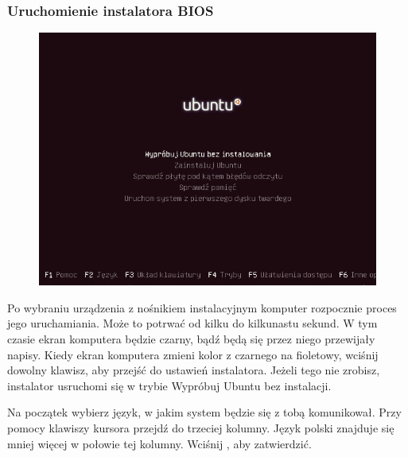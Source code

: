\subsubsection{Uruchomienie instalatora BIOS}
\label{instalacja_uruchomienie}
\begin{figure}
	\vspace{-10pt}
	\includegraphics[width=\linewidth]{images/instalacja_BIOS_boot.png}
\end{figure}

Po wybraniu urządzenia z nośnikiem instalacyjnym komputer rozpocznie proces jego uruchamiania. Może to potrwać od kilku do kilkunastu sekund. W tym czasie ekran komputera będzie czarny, bądź będą się przez niego przewijały napisy. Kiedy ekran komputera zmieni kolor z czarnego na fioletowy, wciśnij dowolny klawisz, aby przejść do ustawień instalatora. Jeżeli tego nie zrobisz, instalator usruchomi się w trybie \textcolor{ubuntu_orange}{Wypróbuj Ubuntu bez instalacji}.

Na początek wybierz język, w jakim system będzie się z tobą komunikował. Przy pomocy klawiszy kursora przejdź do trzeciej kolumny. Język polski znajduje się mniej więcej w połowie tej kolumny. Wciśnij \keys{\returnwin}, aby zatwierdzić.


